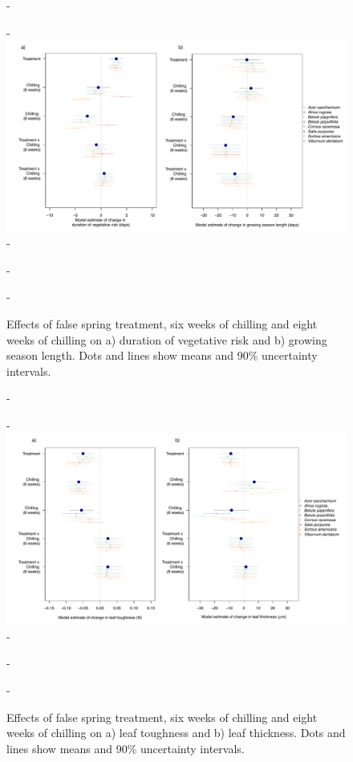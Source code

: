 \documentclass{article}\usepackage[]{graphicx}\usepackage[]{color}
\begin{document}
  {\begin{figure} [H]
  -\begin{center}
  -\includegraphics[width=18cm]{..//analyses/figures/mu_phen90.pdf} 
  -\caption{Effects of false spring treatment, six weeks of chilling and eight weeks of chilling on a) duration of vegetative risk and b) growing season length. Dots and lines show means and 90\% uncertainty intervals.}\label{fig:muphen}
  -\end{center}
  -\end{figure}}
  
  {\begin{figure} [H]
  -\begin{center}
  -\includegraphics[width=18cm]{..//analyses/figures/mu_leaftraits90.pdf} 
  -\caption{Effects of false spring treatment, six weeks of chilling and eight weeks of chilling on a) leaf toughness and b) leaf thickness. Dots and lines show means and 90\% uncertainty intervals. }\label{fig:muleaf}
  -\end{center}
  -\end{figure}}
  
\end{document}
